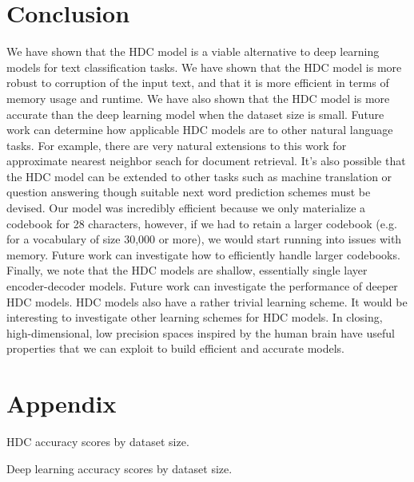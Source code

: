 \documentclass[conference]{IEEEtran}
\begin{document}
\section{Conclusion}
We have shown that the HDC model is a viable alternative to deep learning models for text classification tasks. We have shown that the HDC model is more robust to corruption of the input text, and that it is more efficient in terms of memory usage and runtime. We have also shown that the HDC model is more accurate than the deep learning model when the dataset size is small. Future work can determine how applicable HDC models are to other natural language tasks. For example, there are very natural extensions to this work for approximate nearest neighbor seach for document retrieval. It's also possible that the HDC model can be extended to other tasks such as machine translation or question answering though suitable next word prediction schemes must be devised. Our model was incredibly efficient because we only materialize a codebook for 28 characters, however, if we had to retain a larger codebook (e.g. for a vocabulary of size 30,000 or more), we would start running into issues with memory. Future work can investigate how to efficiently handle larger codebooks. Finally, we note that the HDC models are shallow, essentially single layer encoder-decoder models. Future work can investigate the performance of deeper HDC models. HDC models also have a rather trivial learning scheme. It would be interesting to investigate other learning schemes for HDC models. In closing, high-dimensional, low precision spaces inspired by the human brain have useful properties that we can exploit to build efficient and accurate models.

\section{Appendix}
\begin{table}[htbp]
\caption{HDC accuracy scores by dataset size.}
\begin{center}
    
\end{center}
\label{tab:hdc_acc}
\end{table}

\begin{table}[htbp]
    \caption{Deep learning accuracy scores by dataset size.}
    \begin{center}
        
    \end{center}
    \label{tab:dl_acc}
\end{table}
\end{document}
